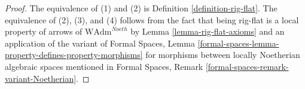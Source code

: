 \documentclass[10pt,a4paper]{amsart}
\theoremstyle{plain}
\theoremstyle{definition}
\theoremstyle{remark}
\numberwithin{equation}{subsection}
\begin{document}
\begin{proof}
The equivalence of (1) and (2) is Definition \ref{definition-rig-flat}.
The equivalence of (2), (3), and (4) follows from the fact that
being rig-flat is a local property of arrows of
$\text{WAdm}^{Noeth}$ by Lemma \ref{lemma-rig-flat-axioms}
and an application of the variant of
Formal Spaces, Lemma
\ref{formal-spaces-lemma-property-defines-property-morphisms}
for morphisms between locally Noetherian algebraic spaces
mentioned in
Formal Spaces, Remark
\ref{formal-spaces-remark-variant-Noetherian}.
\end{proof}
\end{document}
